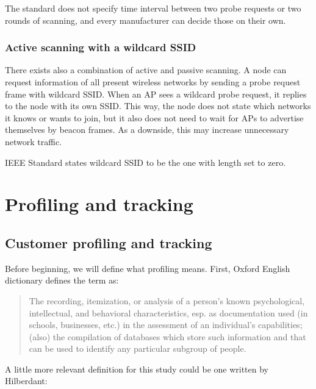 \documentclass[12pt,a4paper,oneside,pdftex]{report}
\begin{document}
The standard does not specify time interval between two probe requests or two rounds of scanning, and every manufacturer can decide those on their own.

\subsection{Active scanning with a wildcard SSID}
\label{subsec:active_wildcard}

There exists also a combination of active and passive scanning. A node can request information of all present wireless networks by sending a probe request frame with wildcard SSID. When an AP sees a wildcard probe request, it replies to the node with its own SSID. This way, the node does not state which networks it knows or wants to join, but it also does not need to wait for APs to advertise themselves by beacon frames. As a downside, this may increase unnecessary network traffic.

IEEE Standard states wildcard SSID to be the one with length set to zero.~\cite{IEEE802.11}




\chapter{Profiling and tracking}
\label{chapter:profiling}

\section{Customer profiling and tracking}
\label{sec:profiling}

Before beginning, we will define what profiling means. First, Oxford English dictionary defines the term as:~\cite{oed_profiling}

\begin{quote}
The recording, itemization, or analysis of a person's known psychological, intellectual, and behavioral characteristics, esp. as documentation used (in schools, businesses, etc.) in the assessment of an individual's capabilities; (also) the compilation of databases which store such information and that can be used to identify any particular subgroup of people.
\end{quote}

A little more relevant definition for this study could be one written by Hilberdant:~\cite{hildebrandt2008}
\end{document}
